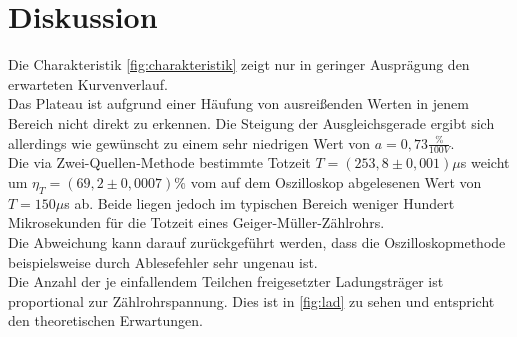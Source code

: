 \section{Diskussion}
\label{sec:Diskussion}

Die Charakteristik \autoref{fig:charakteristik} zeigt nur in geringer Ausprägung den erwarteten 
Kurvenverlauf.\\
Das Plateau ist aufgrund einer Häufung von ausreißenden Werten in jenem Bereich
nicht direkt zu erkennen. Die Steigung der Ausgleichsgerade ergibt sich allerdings wie gewünscht zu einem 
sehr niedrigen Wert von $a = 0,73 \frac{\%}{100 V}$.\\


Die via Zwei-Quellen-Methode bestimmte Totzeit $T = (253,8 \pm 0,001) \mu$s weicht um 
$\eta_T = (69,2 \pm 0,0007) \% $ vom auf dem Oszilloskop abgelesenen Wert von $T = 150 \mu$s 
ab. 
Beide liegen jedoch im typischen Bereich weniger Hundert Mikrosekunden für die Totzeit eines Geiger-Müller-Zählrohrs.\\
Die Abweichung kann darauf zurückgeführt werden, dass die Oszilloskopmethode
beispielsweise durch Ablesefehler sehr ungenau ist.\\

Die Anzahl der je einfallendem Teilchen freigesetzter Ladungsträger 
ist proportional zur Zählrohrspannung. Dies ist in \autoref{fig:lad} zu sehen und entspricht den
theoretischen Erwartungen.\\